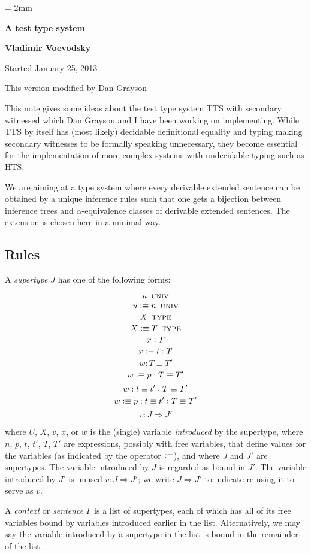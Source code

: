 \documentclass[11pt]{article}
\newcommand{\eqd}{\equiv}
\newcommand{\ccolon}{\vcentcolon}
\newcommand{\Univ}{\mathop{\text{ \sc univ}}}
\newcommand{\Type}{\mathop{\text{ \sc type}}}
\newcommand{\defn}{\vcentcolon\equiv}
\begin{document}
\parskip = 2mm
\begin{center}
{\bf\Large A test type system}

{\bf Vladimir Voevodsky}

{Started January 25, 2013}  

{This version modified by Dan Grayson}  
\end{center}

\tableofcontents

This note gives some ideas about the test type system TTS with secondary
witnessed which Dan Grayson and I have been working on implementing. While TTS
by itself has (most likely) decidable definitional equality and typing making
secondary witnesses to be formally speaking unnecessary, they become essential
for the implementation of more complex systems with undecidable typing such as
HTS.

We are aiming at a type system where every derivable extended sentence can be
obtained by a unique inference rules such that one gets a bijection between
inference trees and $\alpha$-equivalence classes of derivable extended
sentences.  The extension is chosen here in a minimal way.

\subsection{Rules}

A {\em supertype} $J$ has one of the following forms:

$$ u \Univ $$
$$ u \defn n \Univ $$
$$ X \Type $$
$$ X \defn T \Type $$
$$ x \ccolon T $$
$$ x \defn t \ccolon T $$
$$ w : T \eqd T' $$
$$ w \defn p : T \eqd T' $$
$$ w : t \eqd t' \ccolon T \eqd T' $$
$$ w \defn p : t \eqd t' \ccolon T \eqd T' $$
$$ v : J \Rightarrow J' $$

where $U$, $X$, $v$, $x$, or $w$ is the (single) variable {\em introduced} by
the supertype, where $n$, $p$, $t$, $t'$, $T$, $T'$ are expressions, possibly
with free variables, that define values for the variables (as indicated by the
operator $\defn$), and where $J$ and $J'$ are supertypes.  The variable
introduced by $J$ is regarded as bound in $J'$.  The variable introduced by
$J'$ is unused $ v : J \Rightarrow J' $; we write $ J \Rightarrow J' $ to
indicate re-using it to serve as $v$.

A {\em context} or {\em sentence} $\Gamma$ is a list of supertypes, each of
which has all of its free variables bound by variables introduced earlier in
the list.  Alternatively, we may say the variable introduced by a supertype in
the list is bound in the remainder of the list.
\end{document}
